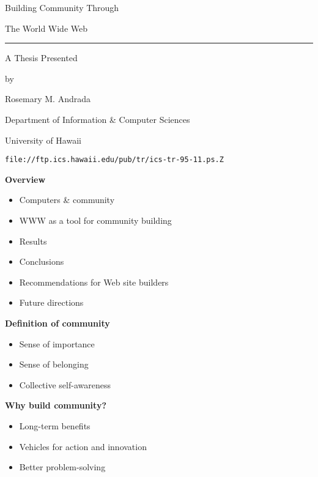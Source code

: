 \begin{slide} \Huge 
  \begin{center}
    Building Community Through

    The World Wide Web

   {\rule{2.0in}{.02in}}
 
   A Thesis Presented 

    
   by
   
   Rosemary M. Andrada

    \vspace{0.5in}

    Department of Information \& Computer Sciences
    
    University of Hawaii
    \LARGE

    {\tt file://ftp.ics.hawaii.edu/pub/tr/ics-tr-95-11.ps.Z}
  \end{center}
\end{slide} \Huge  


\begin{slide} \Huge 
  {\bf Overview} \horizontalline
  \begin{itemize}
  \item Computers \& community

  \item WWW as a tool for community building

  \item Results

  \item Conclusions

  \item Recommendations for Web site builders

  \item Future directions
  \end{itemize}
\end{slide} \Huge   

\begin{slide}\Huge 
  {\bf Definition of community}
  \horizontalline
  \begin{itemize}
  \item Sense of importance

  \item Sense of belonging

  \item Collective self-awareness
  \end{itemize}
\end{slide}\Huge 

\begin{slide}\Huge 
  {\bf Why build community?}
  \horizontalline
  \begin{itemize}
  \item Long-term benefits

  \item Vehicles for action and innovation

  \item Better problem-solving
  \end{itemize}
\end{slide}\Huge 


